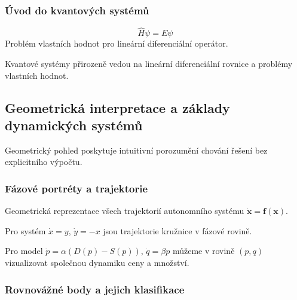 \subsubsection{Úvod do kvantových systémů}

\begin{example}
\[
\hat{H}\psi = E\psi
\]
Problém vlastních hodnot pro lineární diferenciální operátor.
\end{example}

\begin{intuition}
Kvantové systémy přirozeně vedou na lineární diferenciální rovnice a problémy vlastních hodnot.
\end{intuition}

\spc

\subsection{Geometrická interpretace a základy dynamických systémů}

\begin{motivation}
Geometrický pohled poskytuje intuitivní porozumění chování řešení bez explicitního výpočtu.
\end{motivation}

\subsubsection{Fázové portréty a trajektorie}

\begin{definition}
Geometrická reprezentace všech trajektorií autonomního systému $\dot{\mathbf{x}} = \mathbf{f}(\mathbf{x})$.
\end{definition}

\begin{example}
Pro systém $\dot{x} = y$, $\dot{y} = -x$ jsou trajektorie kružnice v fázové rovině.
\end{example}

\begin{example}
Pro model $\dot{p} = \alpha(D(p) - S(p))$, $\dot{q} = \beta p$ můžeme v rovině $(p,q)$ vizualizovat společnou dynamiku ceny a množství.
\end{example}

\subsubsection{Rovnovážné body a jejich klasifikace}

